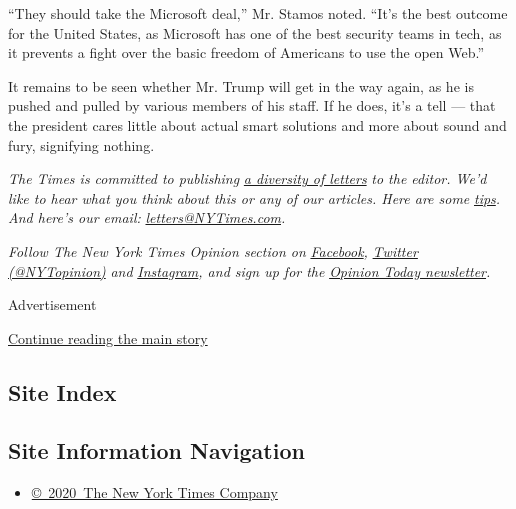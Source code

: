 ``They should take the Microsoft deal,'' Mr. Stamos noted. ``It's the
best outcome for the United States, as Microsoft has one of the best
security teams in tech, as it prevents a fight over the basic freedom of
Americans to use the open Web.''

It remains to be seen whether Mr. Trump will get in the way again, as he
is pushed and pulled by various members of his staff. If he does, it's a
tell --- that the president cares little about actual smart solutions
and more about sound and fury, signifying nothing.

\emph{The Times is committed to publishing}
\href{https://www.nytimes3xbfgragh.onion/2019/01/31/opinion/letters/letters-to-editor-new-york-times-women.html}{\emph{a
diversity of letters}} \emph{to the editor. We'd like to hear what you
think about this or any of our articles. Here are some}
\href{https://help.nytimes3xbfgragh.onion/hc/en-us/articles/115014925288-How-to-submit-a-letter-to-the-editor}{\emph{tips}}\emph{.
And here's our email:}
\href{mailto:letters@NYTimes.com}{\emph{letters@NYTimes.com}}\emph{.}

\emph{Follow The New York Times Opinion section on}
\href{https://www.facebookcorewwwi.onion/nytopinion}{\emph{Facebook}}\emph{,}
\href{http://twitter.com/NYTOpinion}{\emph{Twitter (@NYTopinion)}}
\emph{and}
\href{https://www.instagram.com/nytopinion/}{\emph{Instagram}}\emph{,
and sign up for the}
\href{http://www.nytimes3xbfgragh.onion/newsletters/opiniontoday/}{\emph{Opinion
Today newsletter}}\emph{.}

Advertisement

\protect\hyperlink{after-bottom}{Continue reading the main story}

\hypertarget{site-index}{%
\subsection{Site Index}\label{site-index}}

\hypertarget{site-information-navigation}{%
\subsection{Site Information
Navigation}\label{site-information-navigation}}

\begin{itemize}
\tightlist
\item
  \href{https://help.nytimes3xbfgragh.onion/hc/en-us/articles/115014792127-Copyright-notice}{©~2020~The
  New York Times Company}
\end{itemize}

